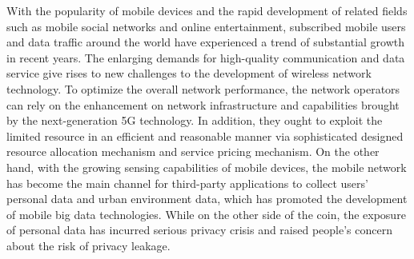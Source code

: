 \begin{englishabstract}

	With the popularity of mobile devices and the rapid development of related fields such as mobile social networks and online entertainment, subscribed mobile users and data traffic around the world have experienced a trend of substantial growth in recent years. The enlarging demands for high-quality communication and data service give rises to new challenges to the development of wireless network technology. To optimize the overall network performance, the network operators can rely on the enhancement on network infrastructure and capabilities brought by the next-generation 5G technology. In addition, they ought to exploit the limited resource in an efficient and reasonable manner via sophisticated designed resource allocation mechanism and service pricing mechanism. On the other hand, with the growing sensing capabilities of mobile devices, the mobile network has become the main channel for third-party applications to collect users' personal data and urban environment data, which has promoted the development of mobile big data technologies. While on the other side of the coin, the exposure of personal data has incurred serious privacy crisis and raised people's concern about the risk of privacy leakage.
	

\end{englishabstract}
